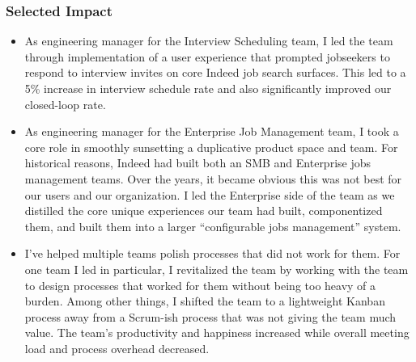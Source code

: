 \documentclass[11pt]{amsart}
\begin{document}
\begin{tcolorbox}[
	title=Software Engineering Manager \textcolor{DarkGray}{/} Indeed,
	after title={\hfill2019 \textcolor{DarkGray}{$\rightarrow$} Present \textcolor{DarkGray}{(7 years)}}
]
\subsubsection{Selected Impact}

\begin{itemize}[noitemsep, leftmargin=2em, label=\raisebox{0.25ex}{\tiny$\bullet$}]
	\item As engineering manager for the Interview Scheduling team, I led the team through implementation of a user experience that prompted jobseekers to respond to interview invites on core Indeed job search surfaces. This led to a 5\% increase in interview schedule rate and also significantly improved our closed-loop rate.
	\item As engineering manager for the Enterprise Job Management team, I took a core role in smoothly sunsetting a duplicative product space and team. For historical reasons, Indeed had built both an SMB and Enterprise jobs management teams. Over the years, it became obvious this was not best for our users and our organization. I led the Enterprise side of the team as we distilled the core unique experiences our team had built, componentized them, and built them into a larger ``configurable jobs management'' system.
	\item I've helped multiple teams polish processes that did not work for them. For one team I led in particular, I revitalized the team by working with the team to design processes that worked for them without being too heavy of a burden. Among other things, I shifted the team to a lightweight Kanban process away from a Scrum-ish process that was not giving the team much value. The team's productivity and happiness increased while overall meeting load and process overhead decreased. %
\end{itemize}

\end{tcolorbox}
\end{document}
